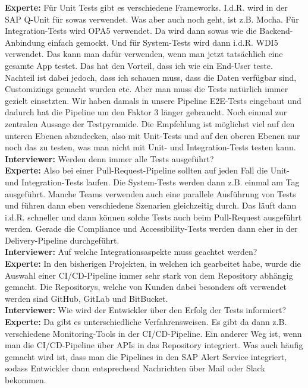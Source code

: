 \begin{linenumbers}
    \textbf{Experte:} Für Unit Tests gibt es verschiedene Frameworks. I.d.R. wird in der SAP Q-Unit für sowas verwendet. Was aber auch noch geht, ist z.B. Mocha. Für Integration-Tests wird OPA5 verwendet. Da wird dann sowas wie die Backend-Anbindung einfach gemockt. Und für System-Tests wird dann i.d.R. WDI5 verwendet. Das kann man dafür verwenden, wenn man jetzt tatsächlich eine gesamte App testet. Das hat den Vorteil, dass ich wie ein End-User teste. Nachteil ist dabei jedoch, dass ich schauen muss, dass die Daten verfügbar sind, Customizings gemacht wurden etc. Aber man muss die Tests natürlich immer gezielt einsetzten. Wir haben damals in unsere Pipeline E2E-Tests eingebaut und dadurch hat die Pipeline um den Faktor 3 länger gebraucht. Noch einmal zur zentralen Aussage der Testpyramide. Die Empfehlung ist möglichst viel auf den unteren Ebenen abzudecken, also mit Unit-Tests und auf den oberen Ebenen nur noch das zu testen, was man nicht mit Unit- und Integration-Tests testen kann.\\
    \textbf{Interviewer:} Werden denn immer alle Tests ausgeführt?\\
    \textbf{Experte:} Also bei einer Pull-Request-Pipeline sollten auf jeden Fall die Unit- und Integration-Tests laufen. Die System-Tests werden dann z.B. einmal am Tag ausgeführt. Manche Teams verwenden auch eine parallele Ausführung von Tests und führen dann eben verschiedene Szenarien gleichzeitig durch. Das läuft dann i.d.R. schneller und dann können solche Tests auch beim Pull-Request ausgeführt werden. Gerade die Compliance und Accessibility-Tests werden dann eher in der Delivery-Pipeline durchgeführt.\\
    \textbf{Interviewer:} Auf welche Integrationsaspekte muss geachtet werden?\\
    \textbf{Experte:} In den bisherigen Projekten, in welchen ich gearbeitet habe, wurde die Auswahl einer CI/CD-Pipeline immer sehr stark von dem Repository abhängig gemacht. Die Repositorys, welche von Kunden dabei besonders oft verwendet werden sind GitHub, GitLab und BitBucket.\\ 
    \textbf{Interviewer:} Wie wird der Entwickler über den Erfolg der Tests informiert?\\
    \textbf{Experte:} Da gibt es unterschiedliche Verfahrensweisen. Es gibt da dann z.B. verschiedene Monitoring-Tools in der CI/CD-Pipeline. Ein anderer Weg ist, wenn man die CI/CD-Pipeline über APIs in das Repository integriert. Was auch häufig gemacht wird ist, dass man die Pipelines in den SAP Alert Service integriert, sodass Entwickler dann entsprechend Nachrichten über Mail oder Slack bekommen.
\end{linenumbers}


